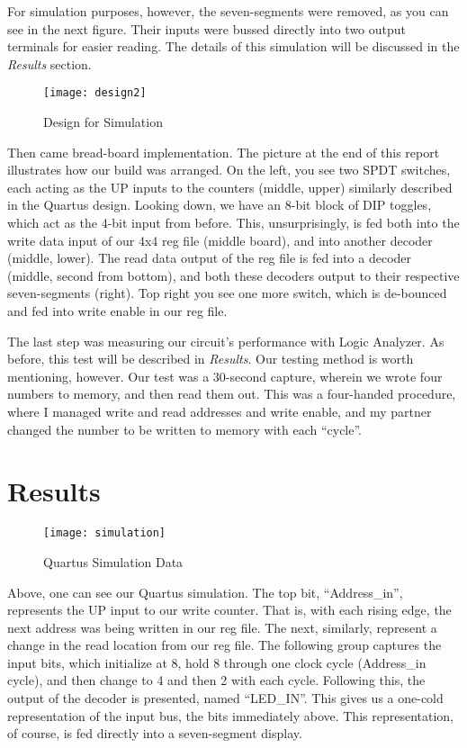 \documentclass[titlepage]{article}
\begin{document}
        For simulation purposes, however, the seven-segments were removed, as you can see in the next figure.  Their inputs were bussed directly into two output terminals for easier reading. 
        The details of this simulation will be discussed in the \textit{Results} section.
        
        \begin{figure}[h]
        	\centering
        	\texttt{[image: design2]}
        	\caption{Design for Simulation}
        \end{figure}
        
        Then came bread-board implementation.  The picture at the end of this report illustrates how our build was arranged.
        On the left, you see two SPDT switches, each acting as the UP inputs to the counters (middle, upper) similarly described in the Quartus design.
        Looking down, we have an 8-bit block of DIP toggles, which act as the 4-bit input from before.
        This, unsurprisingly, is fed both into the write data input of our 4x4 reg file (middle board), and into another decoder (middle, lower).
        The read data output of the reg file is fed into a decoder (middle, second from bottom), and both these decoders output to their respective seven-segments (right).
        Top right you see one more switch, which is de-bounced and fed into write enable in our reg file.
        
        The last step was measuring our circuit's performance with Logic Analyzer.  As before, this test will be described in \textit{Results}.  
        Our testing method is worth mentioning, however.
        Our test was a 30-second capture, wherein we wrote four numbers to memory, and then read them out.  
        This was a four-handed procedure, where I managed write and read addresses and write enable, and my partner changed the number to be written to memory with each ``cycle''.
        
        
    \section{Results}
    
        \begin{figure}[h]
        	\centering
        	\texttt{[image: simulation]}
        	\caption{Quartus Simulation Data}
        \end{figure}
    
        Above, one can see our Quartus simulation.  The top bit, ``Address\_in'', represents the UP input to our write counter.
        That is, with each rising edge, the next address was being written in our reg file.
        The next, similarly, represent a change in the read location from our reg file.
        The following group captures the input bits, which initialize at 8, hold 8 through one clock cycle (Address\_in cycle), and then change to 4 and then 2 with each cycle.
        Following this, the output of the decoder is presented, named ``LED\_IN''.  
        This gives us a one-cold representation of the input bus, the bits immediately above.  
        This representation, of course, is fed directly into a seven-segment display.
        
\end{document}
